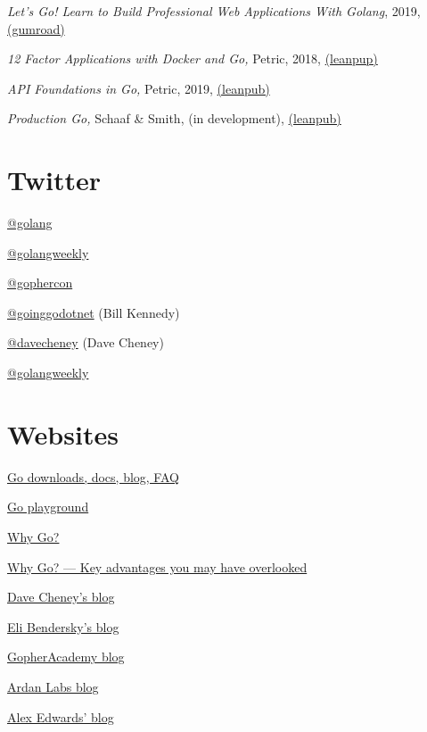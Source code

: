 \documentclass[12pt,notitlepage]{article}
\begin{document}
{\em Let's Go! Learn to Build Professional Web Applications With Golang}, 2019, 
\href{https://lets-go.alexedwards.net}{(gumroad)}

{\em 12 Factor Applications with Docker and Go,} Petric, 2018, \href{https://leanpub.com/12fa-docker-golang}{(leanpup)}

{\em API Foundations in Go,} Petric, 2019, \href{https://leanpub.com/api-foundations}{(leanpub)}

{\em Production Go,} Schaaf \& Smith, (in development), \href{https://leanpub.com/productiongo}{(leanpub)}

\section{Twitter}

\href{https://twitter.com/search?q=%40golang}{@golang}

\href{https://twitter.com/golangweekly}{@golangweekly}

\href{https://twitter.com/GopherCon}{@gophercon}

\href{https://twitter.com/goinggodotnet}{@goinggodotnet} (Bill Kennedy)

\href{https://twitter.com/davecheney}{@davecheney} (Dave Cheney)

\href{https://twitter.com/golangweekly}{@golangweekly}


\section{Websites}

\href{https://golang.org}{\color{red} Go downloads, docs, blog, FAQ}

\href{https://play.golang.org/}{Go playground}

\href{https://dave.cheney.net/2017/03/20/why-go}{Why Go?}

\href{https://yourbasic.org/golang/advantages-over-java-python}{Why Go? --- Key advantages you may have overlooked}

\href{https://dave.cheney.net/category/golang}{\color{red} Dave Cheney's blog}

\href{https://eli.thegreenplace.net/tag/go}{Eli Bendersky's blog}

\href{https://blog.gopheracademy.com}{GopherAcademy blog}

\href{https://www.ardanlabs.com/blog/}{\color{red} Ardan Labs blog}

\href{https://www.alexedwards.net/blog/}{Alex Edwards' blog}
\end{document}
